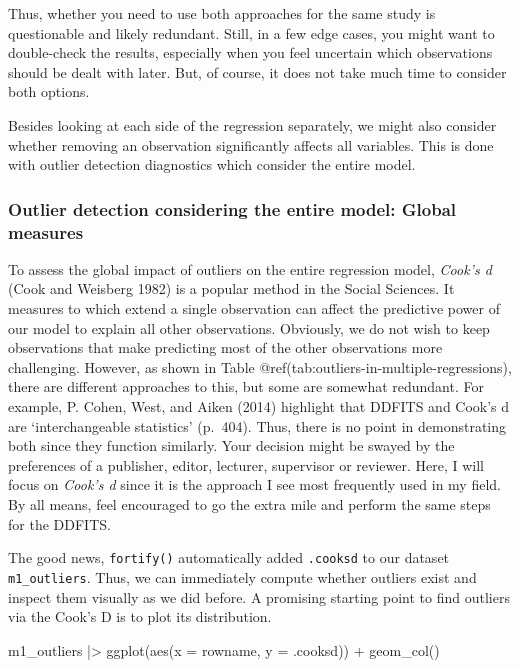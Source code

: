 \documentclass[
  letterpaper,
]{krantz}
\makeatletter
\newenvironment{Shaded}{\begin{snugshade}}{\end{snugshade}}
\newcommand{\AttributeTok}[1]{\textcolor[rgb]{0.40,0.45,0.13}{#1}}
\newcommand{\FunctionTok}[1]{\textcolor[rgb]{0.28,0.35,0.67}{#1}}
\newcommand{\NormalTok}[1]{\textcolor[rgb]{0.00,0.23,0.31}{#1}}
\newcommand{\SpecialCharTok}[1]{\textcolor[rgb]{0.37,0.37,0.37}{#1}}
\newenvironment{kframe}{%
\medskip{}
\setlength{\fboxsep}{.8em}
 \def\at@end@of@kframe{}%
 \ifinner\ifhmode%
  \def\at@end@of@kframe{\end{minipage}}%
  \begin{minipage}{\columnwidth}%
 \fi\fi%
 \def\FrameCommand##1{\hskip\@totalleftmargin \hskip-\fboxsep
 \colorbox{shadecolor}{##1}\hskip-\fboxsep
     \hskip-\linewidth \hskip-\@totalleftmargin \hskip\columnwidth}%
 \MakeFramed {\advance\hsize-\width
   \@totalleftmargin\z@ \linewidth\hsize
   \@setminipage}}%
 {\par\unskip\endMakeFramed%
 \at@end@of@kframe}
\renewenvironment{Shaded}{\begin{kframe}}{\end{kframe}}
\makeatother
\begin{document}
Thus, whether you need to use both approaches for the same study is
questionable and likely redundant. Still, in a few edge cases, you might
want to double-check the results, especially when you feel uncertain
which observations should be dealt with later. But, of course, it does
not take much time to consider both options.

Besides looking at each side of the regression separately, we might also
consider whether removing an observation significantly affects all
variables. This is done with outlier detection diagnostics which
consider the entire model.

\subsubsection{Outlier detection considering the entire model: Global
measures}\label{sec-outlier-detection-global-measures}

To assess the global impact of outliers on the entire regression model,
\emph{Cook's d} (Cook and Weisberg 1982) is a popular method in the
Social Sciences. It measures to which extend a single observation can
affect the predictive power of our model to explain all other
observations. Obviously, we do not wish to keep observations that make
predicting most of the other observations more challenging. However, as
shown in Table @ref(tab:outliers-in-multiple-regressions), there are
different approaches to this, but some are somewhat redundant. For
example, P. Cohen, West, and Aiken (2014) highlight that DDFITS and
Cook's d are `interchangeable statistics' (p.~404). Thus, there is no
point in demonstrating both since they function similarly. Your decision
might be swayed by the preferences of a publisher, editor, lecturer,
supervisor or reviewer. Here, I will focus on \emph{Cook's d} since it
is the approach I see most frequently used in my field. By all means,
feel encouraged to go the extra mile and perform the same steps for the
DDFITS.

The good news, \texttt{fortify()} automatically added \texttt{.cooksd}
to our dataset \texttt{m1\_outliers}. Thus, we can immediately compute
whether outliers exist and inspect them visually as we did before. A
promising starting point to find outliers via the Cook's D is to plot
its distribution.

\begin{Shaded}
\begin{Highlighting}[]
\NormalTok{m1\_outliers }\SpecialCharTok{|\textgreater{}}
  \FunctionTok{ggplot}\NormalTok{(}\FunctionTok{aes}\NormalTok{(}\AttributeTok{x =}\NormalTok{ rowname,}
             \AttributeTok{y =}\NormalTok{ .cooksd)) }\SpecialCharTok{+}
  \FunctionTok{geom\_col}\NormalTok{()}
\end{Highlighting}
\end{Shaded}
\end{document}
